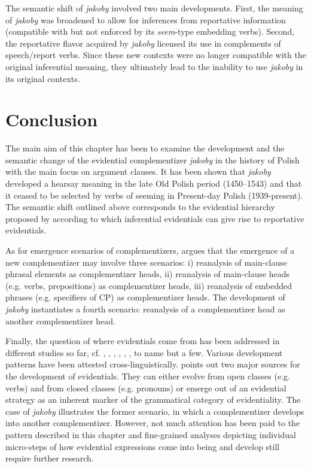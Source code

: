 \documentclass[output=paper
,modfonts
,nonflat]{langsci/langscibook}
\begin{document}
\noindent The semantic shift of \emph{jakoby} involved two main developments. First, the meaning of \emph{jakoby} was broadened to allow for inferences from reportative information (compatible with but not enforced by its \emph{seem}-type embedding verbs). Second, the reportative flavor acquired by \emph{jakoby} licensed its use in complements of speech\slash report verbs. Since these new contexts were no longer compatible with the original inferential meaning, they ultimately lead to the inability to use \emph{jakoby} in its original contexts.

\section{Conclusion}

The main aim of this chapter has been to examine the development and the semantic change of the evidential complementizer \emph{jakoby} in the history of Polish with the main focus on argument clauses. It has been shown that \emph{jakoby} developed a hearsay meaning in the late Old Polish period (1450--1543) and that it  ceased to be selected by verbs of seeming in Present-day Polish (1939-present). The semantic shift outlined above corresponds to the evidential hierarchy proposed by \textcite{Haan1999} according to which inferential evidentials can give rise to reportative evidentials.

As for emergence scenarios of complementizers, \textcite[433]{Willis2007} argues that the emergence of a new complementizer may involve three scenarios: i) reanalysis of main-clause phrasal elements as complementizer heads, ii) reanalysis of main-clause heads (e.g. verbs, prepositions) as complementizer heads, iii) reanalysis of embedded phrases (e.g. specifiers of CP) as complementizer heads. The development of \emph{jakoby} instantiates a fourth scenario: reanalysis of a complementizer head as another complementizer head.

Finally, the question of where evidentials come from has been addressed in different studies so far, cf. \textcite{Willett1988}, \textcite{Lazard2001}, \textcite[271--302]{Aikhenvald2004}, \textcite{Aikhenvald2011}, \textcite{Jalava2017}, \textcite{Friedman2018}, to name but a few. Various development patterns have been attested cross-linguistically. \textcite{Aikhenvald2011} points out two major sources for the development of evidentials. They can either evolve from open classes (e.g. verbs) and from closed classes (e.g. pronouns) or emerge out of an evidential  strategy as an inherent marker of the grammatical category of evidentiality. The case of \emph{jakoby} illustrates the former scenario, in which a complementizer develops into another complementizer. However, not much attention has been paid to the pattern described in this chapter and fine-grained analyses depicting individual micro-steps of how evidential expressions come into being and develop still require further research.
\end{document}
